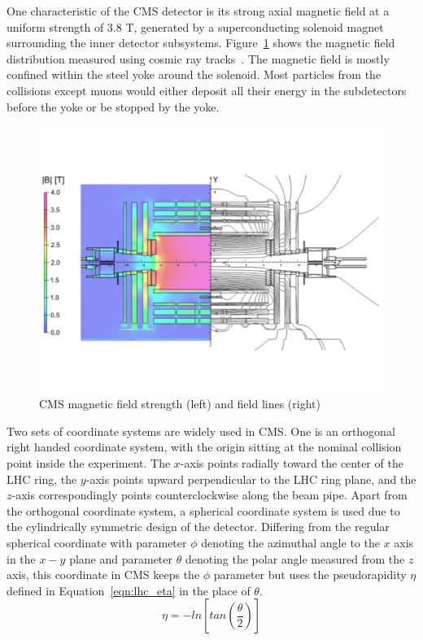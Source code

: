 \vspace{0.3cm}
One characteristic of the CMS detector is its strong axial magnetic field at a uniform strength of 3.8 T, generated by a superconducting solenoid magnet surrounding the inner detector subsystems. Figure~\ref{fig:lhc_magnetdistr} shows the magnetic field distribution measured using cosmic ray tracks~\cite{lhc_magnetmap}. The magnetic field is mostly confined within the steel yoke around the solenoid. Most particles from the collisions except muons would either deposit all their energy in the subdetectors before the yoke or be stopped by the yoke.
\begin{figure}[htbp]
\begin{center}
\includegraphics[width=0.7\linewidth, page=1]{figures/lhc_magnetdistr.pdf}
\caption{CMS magnetic field strength (left) and field lines (right)}
\label{fig:lhc_magnetdistr}
\end{center}
\end{figure}

\vspace{0.3cm}
Two sets of coordinate systems are widely used in CMS. One is an orthogonal right handed coordinate system, with the origin sitting at the nominal collision point inside the experiment. The $x$-axis points radially toward the center of the LHC ring, the $y$-axis points upward perpendicular to the LHC ring plane, and the $z$-axis correspondingly points counterclockwise along the beam pipe. Apart from the orthogonal coordinate system, a spherical coordinate system is used due to the cylindrically symmetric design of the detector. Differing from the regular spherical coordinate with parameter $\phi$ denoting the azimuthal angle to the $x$ axis in the $x-y$ plane and parameter $\theta$ denoting the polar angle measured from the $z$ axis, this coordinate in CMS keeps the $\phi$ parameter but uses the pseudorapidity $\eta$ defined in Equation~\ref{eqn:lhc_eta} in the place of $\theta$.
\begin{equation}
\eta = -ln[tan(\frac{\theta}{2})]
\label{eqn:lhc_eta}
\end{equation}

